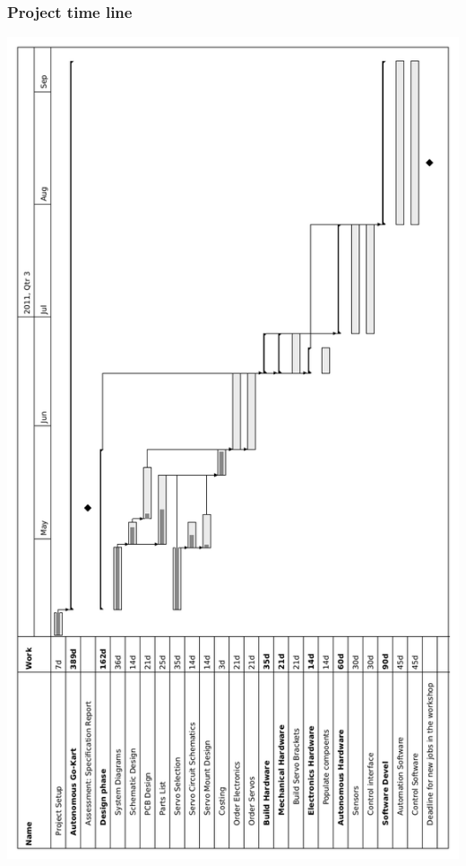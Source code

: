 \documentclass{beamer}
\begin{document}

\begin{frame}
\frametitle{Project time line}
    \begin{center}
      \includegraphics[angle=270,width=1.0\textwidth]{Images/Gantt}
    \end{center}
\end{frame}
\end{document}
